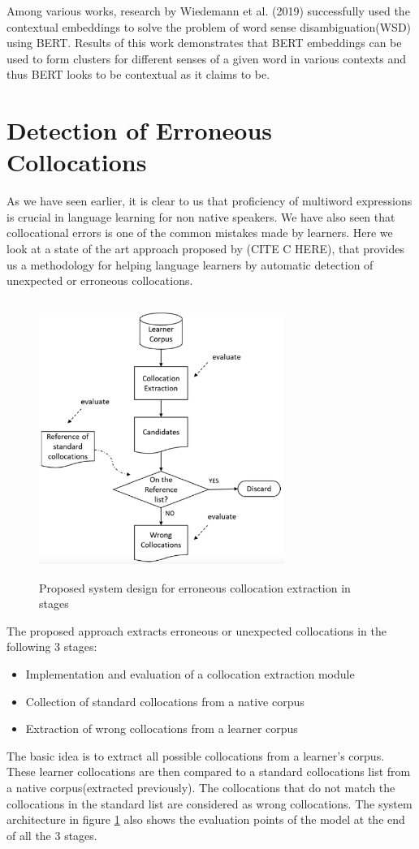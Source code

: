 \documentclass[11pt,a4paper]{article}
\begin{document}
Among various works, research by Wiedemann et al. (2019) successfully used the contextual embeddings to solve the problem of word sense disambiguation(WSD) using BERT. Results of this work demonstrates that BERT embeddings can be used to form clusters for different senses of a given word in various contexts and thus BERT looks to be contextual as it claims to be. 

\section{Detection of Erroneous Collocations}

As we have seen earlier, it is clear to us that proficiency of multiword expressions is crucial in language learning for non native speakers. We have also seen that collocational errors is one of the common mistakes made by learners. Here we look at a state of the art approach proposed by (CITE C HERE), that provides us a methodology for helping language learners by automatic detection of unexpected or erroneous collocations.

\begin{figure}[H]
  \includegraphics[width=8cm, height=9cm]{gfx/collocation_system}
  \caption{Proposed system design for erroneous collocation extraction in stages}
  \label{fig:colloc_sys}
\end{figure}

The proposed approach extracts erroneous or unexpected collocations in the following 3 stages:
\begin{itemize}
  \item Implementation and evaluation of a collocation extraction module
  \item Collection of standard collocations from a native corpus
  \item Extraction of wrong collocations from a learner corpus
\end{itemize}
The basic idea is to extract all possible collocations from a learner's corpus. These learner collocations are then compared to a standard collocations list from a native corpus(extracted previously). The collocations that do not match the collocations in the standard list are considered as wrong collocations. The system architecture in figure \ref{fig:colloc_sys} also shows the evaluation points of the model at the end of all the 3 stages. 
\end{document}
